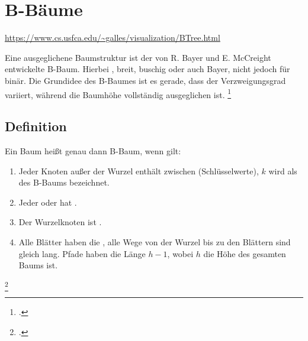 \documentclass{lehramt-informatik-haupt}
\begin{document}

\chapter{B-Bäume}

\begin{liQuellen}
\item \cite{wiki:bbaum}
\item \cite[Kapitel 14.4.3, Seite 386-399 (PDF 402-415)]{saake}
\item \cite[Kapitel 13.5.4.2 Balancierte Mehrwegbäume, Seite 464, wird
nur erwähnt, nicht beschrieben]{schneider}
\end{liQuellen}

\url{https://www.cs.usfca.edu/~galles/visualization/BTree.html}

\noindent
Eine ausgeglichene Baumstruktur ist der von R. Bayer und E. McCreight
entwickelte B-Baum. Hierbei ,
breit, buschig oder auch Bayer, nicht jedoch für binär. Die Grundidee
des B-Baumes ist es gerade, dass der Verzweigungsgrad variiert, während
die Baumhöhe vollständig ausgeglichen ist.
\footcite[Seite 386]{saake}

%

\section{Definition}

Ein Baum heißt genau dann B-Baum, wenn gilt:
%

\begin{enumerate}
\item Jeder Knoten außer der Wurzel enthält zwischen  (Schlüsselwerte), $k$ wird als  des B-Baums
bezeichnet.
%
\item Jeder  oder hat
.
%
\item Der Wurzelknoten ist .
%
\item Alle Blätter haben die , \dh alle Wege von
der Wurzel bis zu den Blättern sind gleich lang. Pfade haben die Länge
$h - 1$, wobei $h$ die Höhe des gesamten Baums ist.
\end{enumerate}
\footcite[Seite 32]{aud:fs:5}
\end{document}
